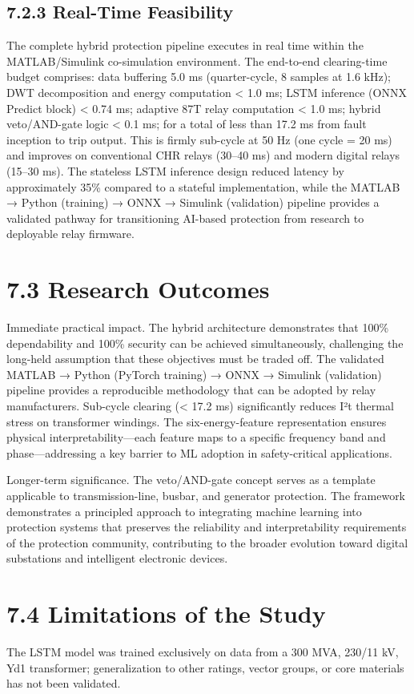\subsection{7.2.3  Real-Time Feasibility}
The complete hybrid protection pipeline executes in real time within the MATLAB/Simulink co-simulation environment. The end-to-end clearing-time budget comprises: data buffering 5.0 ms (quarter-cycle, 8 samples at 1.6 kHz); DWT decomposition and energy computation < 1.0 ms; LSTM inference (ONNX Predict block) < 0.74 ms; adaptive 87T relay computation < 1.0 ms; hybrid veto/AND-gate logic < 0.1 ms; for a total of less than 17.2 ms from fault inception to trip output. This is firmly sub-cycle at 50 Hz (one cycle = 20 ms) and improves on conventional CHR relays (30--40 ms) and modern digital relays (15--30 ms). The stateless LSTM inference design reduced latency by approximately 35\% compared to a stateful implementation, while the MATLAB → Python (training) → ONNX → Simulink (validation) pipeline provides a validated pathway for transitioning AI-based protection from research to deployable relay firmware.


\section{7.3  Research Outcomes}
Immediate practical impact. The hybrid architecture demonstrates that 100\% dependability and 100\% security can be achieved simultaneously, challenging the long-held assumption that these objectives must be traded off. The validated MATLAB → Python (PyTorch training) → ONNX → Simulink (validation) pipeline provides a reproducible methodology that can be adopted by relay manufacturers. Sub-cycle clearing (< 17.2 ms) significantly reduces I²t thermal stress on transformer windings. The six-energy-feature representation ensures physical interpretability---each feature maps to a specific frequency band and phase---addressing a key barrier to ML adoption in safety-critical applications.

Longer-term significance. The veto/AND-gate concept serves as a template applicable to transmission-line, busbar, and generator protection. The framework demonstrates a principled approach to integrating machine learning into protection systems that preserves the reliability and interpretability requirements of the protection community, contributing to the broader evolution toward digital substations and intelligent electronic devices.


\section{7.4  Limitations of the Study}
The LSTM model was trained exclusively on data from a 300 MVA, 230/11 kV, Yd1 transformer; generalization to other ratings, vector groups, or core materials has not been validated.

